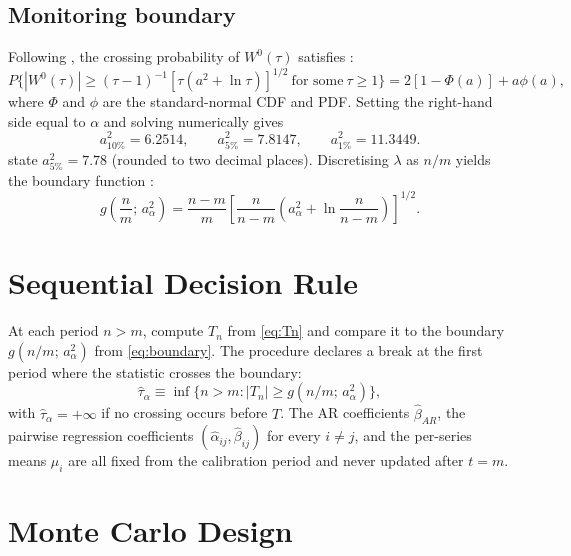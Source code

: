 \documentclass[12pt]{article}
\begin{document}
\subsection{Monitoring boundary}

Following \citet{ChuStinchcombeWhite1996}, the crossing probability of
$W^0(\tau)$ satisfies \citep[eq.~(5)]{WangHsiao2013}:
\begin{equation}
P\bigl\{|W^0(\tau)| \ge (\tau-1)^{-1}[\tau(a^2+\ln\tau)]^{1/2}
\ \text{for some}\ \tau \ge 1\bigr\}
= 2[1-\Phi(a)] + a\phi(a),
\label{eq:crossingprob}
\end{equation}
where $\Phi$ and $\phi$ are the standard-normal CDF and PDF. Setting the
right-hand side equal to $\alpha$ and solving numerically gives
\begin{equation}
a^2_{10\%} = 6.2514, \qquad
a^2_{5\%}  = 7.8147, \qquad
a^2_{1\%}  = 11.3449.
\label{eq:a2}
\end{equation}
\citet{WangHsiao2013} state $a^2_{5\%} = 7.78$ (rounded to two decimal
places). Discretising $\lambda$ as $n/m$ yields the boundary function
\citep[p.~6]{WangHsiao2013}:
\begin{equation}
g\!\left(\frac{n}{m};\,a^2_\alpha\right)
= \frac{n-m}{m}
  \left[\frac{n}{n-m}
        \left(a^2_\alpha + \ln\frac{n}{n-m}\right)\right]^{1/2}.
\label{eq:boundary}
\end{equation}

\section{Sequential Decision Rule}
\label{sec:stopping}

At each period $n > m$, compute $T_n$ from \eqref{eq:Tn} and compare it
to the boundary $g(n/m;\,a^2_\alpha)$ from \eqref{eq:boundary}. The
procedure declares a break at the first period where the statistic crosses
the boundary:
\begin{equation}
\hat\tau_\alpha \equiv
\inf\bigl\{n > m : |T_n| \ge g\!\left(n/m;\,a^2_\alpha\right)\bigr\},
\label{eq:stoptime}
\end{equation}
with $\hat\tau_\alpha = +\infty$ if no crossing occurs before $T$. The AR
coefficients $\hat\beta_{AR}$, the pairwise regression coefficients
$(\hat\alpha_{ij},\hat\beta_{ij})$ for every $i\ne j$, and the per-series
means $\mu_i$ are all fixed from the calibration period and never updated
after $t=m$.

\section{Monte Carlo Design}
\label{sec:mc}
\end{document}
